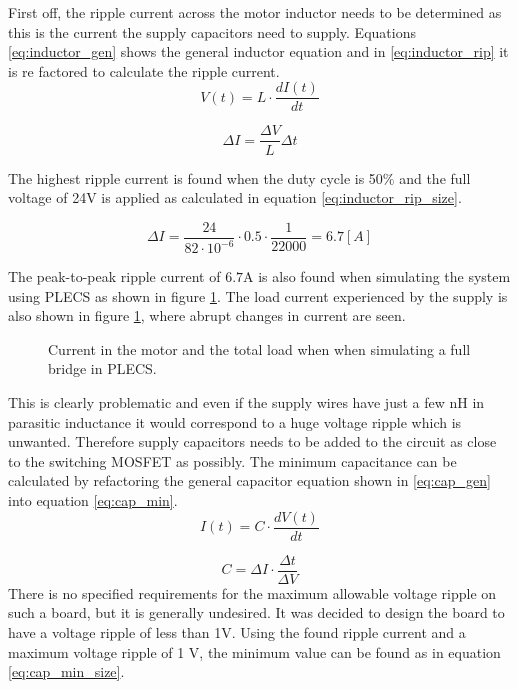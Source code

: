 First off, the ripple current across the motor inductor needs to be determined as this is the current the supply capacitors need to supply.
Equations \ref{eq:inductor_gen} shows the general inductor equation and in \ref{eq:inductor_rip} it is re factored to calculate the ripple current.
\begin{equation}
	V(t) = L \cdot \frac{dI(t)}{dt}
	\label{eq:inductor_gen}
\end{equation}

\begin{equation}
	\Delta I = \frac{\Delta V}{L} \Delta t
	\label{eq:inductor_rip}
\end{equation}

The highest ripple current is found when the duty cycle is 50$\%$ and the full voltage of 24V is applied as calculated in equation \ref{eq:inductor_rip_size}.

\begin{equation}
	\Delta I = \frac{24}{82\cdot 10^{-6}} \cdot 0.5 \cdot \frac{1}{22000} = 6.7 [A] 
	\label{eq:inductor_rip_size}
\end{equation}

The peak-to-peak ripple current of $6.7$A is also found when simulating the system using PLECS as shown in figure \ref{fig:sim_currents}.
The load current experienced by the supply is also shown in figure \ref{fig:sim_currents}, where abrupt changes in current are seen. 

\begin{figure}[h]
	\centering
    
	\caption{Current in the motor and the total load when when simulating a full bridge in PLECS.}
	\label{fig:sim_currents}
\end{figure}

This is clearly problematic and even if the supply wires have just a few nH in parasitic inductance it would correspond to a huge voltage ripple which is unwanted. 
Therefore supply capacitors needs to be added to the circuit as close to the switching MOSFET as possibly.
The minimum capacitance can be calculated by refactoring the general capacitor equation shown in \ref{eq:cap_gen} into equation \ref{eq:cap_min}.
\begin{equation} 
	I(t) = C \cdot \frac{dV(t)}{dt}
	\label{eq:cap_gen}
\end{equation}

\begin{equation} 
	C = \Delta I \cdot \frac{\Delta t}{\Delta V}
	\label{eq:cap_min}
\end{equation}
There is no specified requirements for the maximum allowable voltage ripple on such a board, but it is generally undesired.
It was decided to design the board to have a voltage ripple of less than 1V.
Using the found ripple current and a maximum voltage ripple of 1 V, the minimum value can be found as in equation \ref{eq:cap_min_size}.

